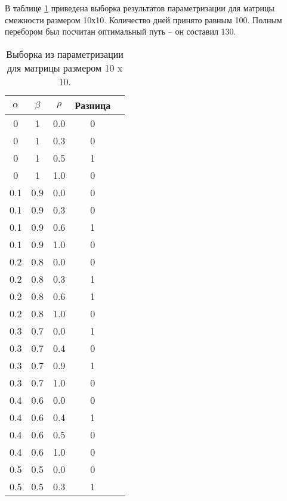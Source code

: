         В таблице \ref{table:test:params} приведена выборка результатов параметризации
        для матрицы смежности размером 10х10. 
        Количество дней принято равным 100. 
        Полным перебором был посчитан оптимальный путь -- он составил 130.

    \begin{table}[h!]
        \caption{Выборка из параметризации для матрицы размером 10 x 10.}
        \label{table:test:params}
        \centering
        \begin{tabular}{|c|c|c|c|c|}
            \hline
            $\alpha$        & $\beta$      & $\rho$  & Разница \\
            \hline
            0    & 1    & 0.0  & 0     \\
            0    & 1    & 0.3  & 0     \\
            0    & 1    & 0.5  & 1     \\
            0    & 1    & 1.0  & 0     \\
            \hline
            0.1  & 0.9  & 0.0  & 0     \\
            0.1  & 0.9  & 0.3  & 0     \\
            0.1  & 0.9  & 0.6  & 1     \\                    
            0.1  & 0.9  & 1.0  & 0     \\
            \hline
            0.2  & 0.8  & 0.0  & 0     \\
            0.2  & 0.8  & 0.3  & 1     \\
            0.2  & 0.8  & 0.6  & 1     \\
            0.2  & 0.8  & 1.0  & 0     \\
            \hline
            0.3  & 0.7  & 0.0  & 1     \\
            0.3  & 0.7  & 0.4  & 0     \\
            0.3  & 0.7  & 0.9  & 1     \\
            0.3  & 0.7  & 1.0  & 0     \\
            \hline
            0.4  & 0.6  & 0.0  & 0     \\
            0.4  & 0.6  & 0.4  & 1     \\
            0.4  & 0.6  & 0.5  & 0     \\
            0.4  & 0.6  & 1.0  & 0     \\
            \hline
            0.5  & 0.5  & 0.0  & 0     \\
            0.5  & 0.5  & 0.3  & 1     \\

\end{tabular}
\end{table}
